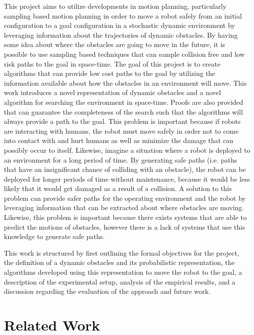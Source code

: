 \documentclass[letterpaper, 10pt, conference]{ieeeconf}
\begin{document}
This project aims to utilize developments in motion planning, particularly
sampling based motion planning in order to move a robot safely from an initial
configuration to a goal configuration in a stochastic dynamic environment by
leveraging information about the trajectories of dynamic obstacles. By having
some idea about where the obstacles are going to move in the future, it is
possible to use sampling based techniques that can sample collision free and
low risk paths to the goal in space-time. The goal of this project is to create
algorithms that can provide low cost paths to the goal by utilizing the
information available about how the obstacles in an environment will move. This
work introduces a novel representation of dynamic obstacles and a novel
algorithm for searching the environment in space-time.  Proofs are also
provided that can guarantee the completeness of the search such that the
algorithms will always provide a path to the goal. This problem is important
because if robots are interacting with humans, the robot must move safely in
order not to come into contact with and hurt humans as well as minimize the
damage that can possibly occur to itself. Likewise, imagine a situation where a
robot is deployed to an environment for a long period of time. By generating
safe paths (i.e. paths that have an insignificant chance of colliding with an
obstacle), the robot can be deployed for longer periods of time without
maintenance, because it would be less likely that it would get damaged as a
result of a collision. A solution to this problem can provide safer paths for
the operating environment and the robot by leveraging information that can be
extracted about where obstacles are moving.  Likewise, this problem is
important because there exists systems that are able to predict the motions of
obstacles, however there is a lack of systems that use this knowledge to
generate safe paths.

This work is structured by first outlining the formal objectives for the
project, the definition of a dynamic obstacles and its probabilistic
representation, the algorithms developed using this representation to move the
robot to the goal, a description of the experimental setup, analysis of the
empirical results, and a discussion regarding the evaluation of the approach
and future work.

\section{Related Work}
\end{document}
